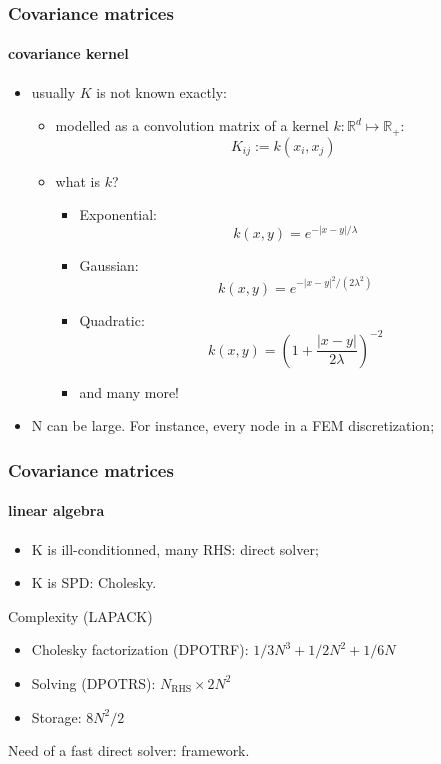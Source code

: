 \begin{frame}
\frametitle{Covariance matrices}
\framesubtitle{covariance kernel}

\begin{itemize}
  \item usually $K$ is not known exactly:
    \begin{itemize}
    \item modelled as a convolution matrix of a kernel $k: \mathbb{R}^d \mapsto \mathbb{R}_{\plus}$:
       \[ K_{ij} := k(x_i,x_j) \]
    \item what is $k$?
    \begin{itemize}
      \item Exponential:
       \[ k(x,y) = e^{-|x-y|/\lambda} \]
      \item Gaussian:
       \[ k(x,y) = e^{-|x-y|^2/(2\lambda^2)} \]
      \item Quadratic:
       \[ k(x,y) = \left(1+\frac{|x-y|}{2 \lambda} \right)^{-2}  \]
      \item and many more!
    \end{itemize}
 \end{itemize}

  \item N can be large. For instance, every node in a FEM discretization;
\end{itemize}
\end{frame}

\begin{frame}
\frametitle{Covariance matrices}
\framesubtitle{linear algebra}
\begin{itemize}
\item K is ill-conditionned, many RHS: direct solver;
\item K is SPD: Cholesky.
\end{itemize}

\begin{block}{Complexity (LAPACK)}
  \begin{itemize}
    \item Cholesky factorization (DPOTRF): $1/3N^3 + 1/2N^2 + 1/6N$
    \item Solving (DPOTRS): $N_{\mathrm{RHS}} \times 2N^2$
    \item Storage: $8N^2/2$
  \end{itemize}
\end{block}
\alert{Need of a fast direct solver: \hmat framework.}
\end{frame}

